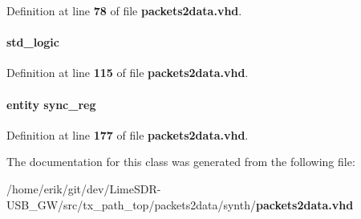Definition at line {\bf 78} of file {\bf packets2data.\+vhd}.

\paragraph[{smpl\+\_\+buff\+\_\+valid\+\_\+int}]{ {\bfseries \textcolor{comment}{std\+\_\+logic}\textcolor{vhdlchar}{ }} \hspace{0.3cm}{\ttfamily [Signal]}}\label{classpackets2data_1_1arch_a251f43f3f312109d3c4f4ecca624fa33}


Definition at line {\bf 115} of file {\bf packets2data.\+vhd}.

\paragraph[{sync\+\_\+reg1}]{ {\bfseries \textcolor{keywordflow}{entity}\textcolor{vhdlchar}{ }\textcolor{vhdlchar}{sync\+\_\+reg}\textcolor{vhdlchar}{ }} \hspace{0.3cm}{\ttfamily [Instantiation]}}\label{classpackets2data_1_1arch_a8fc8454c91408892606d3cf049de8638}


Definition at line {\bf 177} of file {\bf packets2data.\+vhd}.



The documentation for this class was generated from the following file\+:\begin{DoxyCompactItemize}
\item 
/home/erik/git/dev/\+Lime\+S\+D\+R-\/\+U\+S\+B\+\_\+\+G\+W/src/tx\+\_\+path\+\_\+top/packets2data/synth/{\bf packets2data.\+vhd}\end{DoxyCompactItemize}
